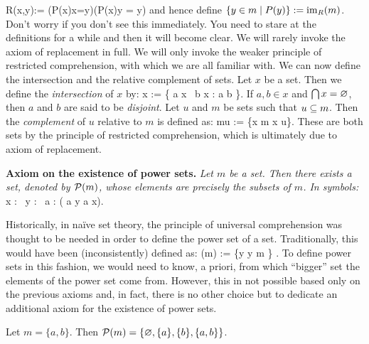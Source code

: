 \bse
R(x,y):= (P(x)\land x=y)\lor(\neg P(x)\land \hat y = y)
\ese
and hence define $\{y \in m \mid P(y)\} := \mathrm{im}_R(m)$. \qedhere
\een
\eq
Don't worry if you don't see this immediately. You need to stare at the definitions for a while and then it will become clear.
\br
We will rarely invoke the axiom of replacement in full. We will only invoke the weaker principle of restricted comprehension, with which we are all familiar with.
\er
We can now define the intersection and the relative complement of sets.
\bd
Let $x$ be a set. Then we define the \emph{intersection} of $x$ by:
\bse
\bigcap x := \{ a \in \bigcup x \mid \forall \, b \in x : a \in b \}.
\ese
If $a,b\in x$ and $\bigcap x = \varnothing$, then $a$ and $b$ are said to be \emph{disjoint}.
\ed
\bd
Let $u$ and $m$ be sets such that $u \subseteq m$. Then the \emph{complement} of $u$ relative to $m$ is defined as:
\bse
m\sm u := \{x \in m \mid x \notin u\}.
\ese
These are both sets by the principle of restricted comprehension, which is ultimately due to axiom of replacement.
\ed

\textbf{Axiom on the existence of power sets.} \emph{Let $m$ be a set. Then there exists a set, denoted by $\mathcal{P}(m)$, whose elements are precisely the subsets of $m$. In symbols:}
\bse
\forall \, x : \exists \, y : \forall \, a : ( a \in y \eqv a \se x).
\ese

Historically, in na\"ive set theory, the principle of universal comprehension was thought to be needed in order to define the power set of a set. Traditionally, this would have been (inconsistently) defined as:
\bse
\cP (m) := \{y \mid y \se m \} .
\ese
To define power sets in this fashion, we would need to know, a priori, from which ``bigger'' set the elements of the power set come from. However, this in not possible based only on the previous axioms and, in fact, there is no other choice but to dedicate an additional axiom for the existence of power sets.

\be
Let $m = \{a,b\}$. Then $\mathcal{P}(m)=\{\varnothing,\{a\},\{b\},\{a,b\}\}$.
\ee

